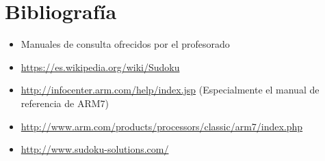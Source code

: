 \documentclass[12pt,letterpaper]{article}
\begin{document}
\section{Bibliografía}
\begin{itemize}
\item Manuales de consulta ofrecidos por el profesorado
\item \url{https://es.wikipedia.org/wiki/Sudoku}
\item \url{http://infocenter.arm.com/help/index.jsp} (Especialmente el
  manual de referencia de ARM7)
\item \url{http://www.arm.com/products/processors/classic/arm7/index.php}
\item \url{http://www.sudoku-solutions.com/}
\end{itemize}
\end{document}
